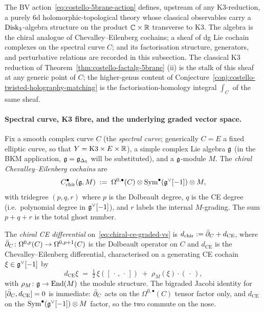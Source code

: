 The BV action~\eqref{eq:costello-5brane-action} defines, upstream of
any K3-reduction, a purely $6$d holomorphic-topological theory whose
classical observables carry a $\mathrm{Disk}_3$-algebra structure on the
product $\mathbb C\times\mathbb R$ transverse to K3. The algebra is the chiral
analogue of Chevalley--Eilenberg cochains; a sheaf of dg Lie
cochain complexes on the spectral curve $C$; and its factorisation
structure, generators, and perturbative relations are recorded in
this subsection. The classical K3 reduction of Theorem~\ref{thm:costello-factalg-5brane}
(ii) is the stalk of this sheaf at any generic point of $C$; the
higher-genus content of Conjecture~\ref{conj:costello-twisted-holography-matching}
is the factorisation-homology integral $\int_C$ of the same sheaf.

\paragraph{Spectral curve, K3 fibre, and the underlying graded vector space.}
Fix a smooth complex curve $C$ (the \emph{spectral curve}; generically
$C = E$ a fixed elliptic curve, so that $Y = \mathrm{K3}\times
E\times\mathbb R$), a simple complex Lie algebra $\mathfrak g$ (in the BKM
application, $\mathfrak g = \mathfrak g_{\Delta_5}$ will be substituted), and a
$\mathfrak g$-module $M$. The \emph{chiral Chevalley--Eilenberg cochains} are
\begin{equation}
\label{eq:chiral-ce-graded-vs}
C^\bullet_{\mathrm{chir}}(\mathfrak g, M)
\;:=\;
\Omega^{0,\bullet}(C)\otimes \operatorname{Sym}^\bullet(\mathfrak g^\vee[-1])\otimes M,
\end{equation}
with tridegree $(p,q,r)$ where $p$ is the Dolbeault degree, $q$ is the
CE degree (i.e.\ polynomial degree in $\mathfrak g^\vee[-1]$), and $r$ labels
the internal $M$-grading. The sum $p+q+r$ is the total ghost number.

\begin{definition}
\label{def:chiral-ce-differential}
The \emph{chiral CE differential} on~\eqref{eq:chiral-ce-graded-vs} is
$d_{\mathrm{chir}} := \bar\partial_C + d_{\mathrm{CE}}$, where
$\bar\partial_C\colon \Omega^{0,p}(C)\to\Omega^{0,p+1}(C)$ is the Dolbeault
operator on $C$ and $d_{\mathrm{CE}}$ is the Chevalley--Eilenberg
differential, characterised on a generating CE cochain
$\xi\in\mathfrak g^\vee[-1]$ by
\begin{equation}
\label{eq:ce-differential-generator}
d_{\mathrm{CE}}\xi
\;=\;
\tfrac12\,\xi([\,\cdot\,,\,\cdot\,])
\;+\;
\rho_M(\xi)\cdot(\,\cdot\,),
\end{equation}
with $\rho_M\colon\mathfrak g\to\operatorname{End}(M)$ the module structure. The bigraded
Jacobi identity for $[\bar\partial_C, d_{\mathrm{CE}}]=0$ is immediate:
$\bar\partial_C$ acts on the $\Omega^{0,\bullet}(C)$ tensor factor only,
and $d_{\mathrm{CE}}$ on the $\operatorname{Sym}^\bullet(\mathfrak g^\vee[-1])\otimes M$
factor, so the two commute on the nose.
\end{definition}

